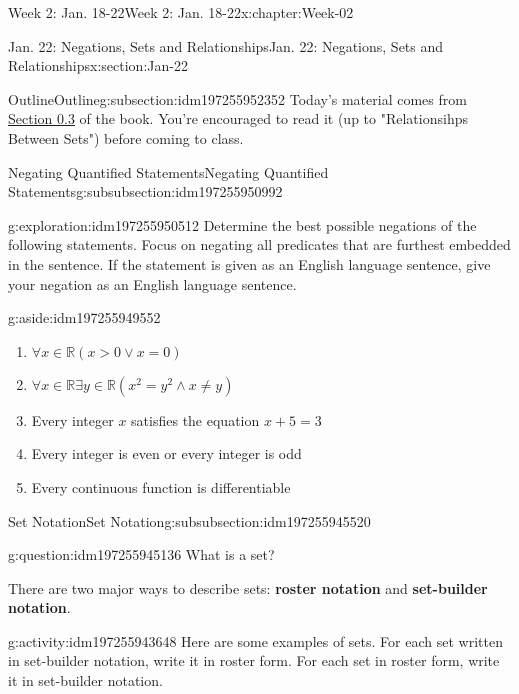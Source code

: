 \documentclass[oneside,10pt,]{book}
\newcommand{\terminology}[1]{\textbf{#1}}
\numberwithin{equation}{section}
\def\R{{\mathbb R}}
\newcommand{\R}{\mathbb R}
\begin{document}
\begin{chapterptx}{Week 2: Jan. 18-22}{}{Week 2: Jan. 18-22}{}{}{x:chapter:Week-02}
\begin{sectionptx}{Jan. 22: Negations, Sets and Relationships}{}{Jan. 22: Negations, Sets and Relationships}{}{}{x:section:Jan-22}
%
\begin{subsectionptx}{Outline}{}{Outline}{}{}{g:subsection:idm197255952352}
Today's material comes from \href{http://discrete.openmathbooks.org/dmoi3/sec_intro-sets.html}{Section 0.3} of the book. You're encouraged to read it (up to "Relationsihps Between Sets") before coming to class.%
%
%
\typeout{************************************************}
\typeout{************************************************}
%
\begin{subsubsectionptx}{Negating Quantified Statements}{}{Negating Quantified Statements}{}{}{g:subsubsection:idm197255950992}
\begin{exploration}{}{g:exploration:idm197255950512}%
Determine the best possible negations of the following statements. Focus on negating all predicates that are furthest embedded in the sentence. If the statement is given as an English language sentence, give your negation as an English language sentence. \begin{aside}{}{g:aside:idm197255949552}%
\end{aside}
%
%
\begin{enumerate}
\item{}\(\displaystyle \forall x\in \R (x>0 \lor x = 0)\)%
\item{}\(\displaystyle \forall x\in \R \exists y\in \R (x^2 = y^2 \land x\ne y)\)%
\item{}Every integer \(x\) satisfies the equation \(x+5=3\)%
\item{}Every integer is even or every integer is odd%
\item{}Every continuous function is differentiable%
\end{enumerate}
\end{exploration}%
\end{subsubsectionptx}
%
%
\typeout{************************************************}
\typeout{************************************************}
%
\begin{subsubsectionptx}{Set Notation}{}{Set Notation}{}{}{g:subsubsection:idm197255945520}
\begin{question}{}{g:question:idm197255945136}%
What is a set?%
\end{question}
There are two major ways to describe sets: \terminology{roster notation} and \terminology{set-builder notation}.%
\begin{activity}{}{g:activity:idm197255943648}%
Here are some examples of sets. For each set written in set-builder notation, write it in roster form. For each set in roster form, write it in set-builder notation.%

\end{activity}
\end{subsubsectionptx}
\end{subsectionptx}
\end{sectionptx}
\end{chapterptx}
\end{document}

